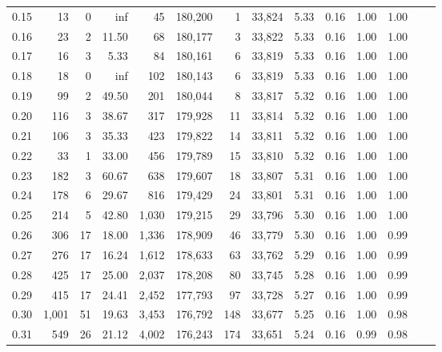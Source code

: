\begin{tabular}{rrrrrrrrrrrrrr}
0.15 &     13 &      0 &     inf &       45 &  180,200 &       1 &  33,824 &  5.33 &  0.16 &  1.00 &      1.00 \\
0.16 &     23 &      2 &   11.50 &       68 &  180,177 &       3 &  33,822 &  5.33 &  0.16 &  1.00 &      1.00 \\
0.17 &     16 &      3 &    5.33 &       84 &  180,161 &       6 &  33,819 &  5.33 &  0.16 &  1.00 &      1.00 \\
0.18 &     18 &      0 &     inf &      102 &  180,143 &       6 &  33,819 &  5.33 &  0.16 &  1.00 &      1.00 \\
0.19 &     99 &      2 &   49.50 &      201 &  180,044 &       8 &  33,817 &  5.32 &  0.16 &  1.00 &      1.00 \\
0.20 &    116 &      3 &   38.67 &      317 &  179,928 &      11 &  33,814 &  5.32 &  0.16 &  1.00 &      1.00 \\
0.21 &    106 &      3 &   35.33 &      423 &  179,822 &      14 &  33,811 &  5.32 &  0.16 &  1.00 &      1.00 \\
0.22 &     33 &      1 &   33.00 &      456 &  179,789 &      15 &  33,810 &  5.32 &  0.16 &  1.00 &      1.00 \\
0.23 &    182 &      3 &   60.67 &      638 &  179,607 &      18 &  33,807 &  5.31 &  0.16 &  1.00 &      1.00 \\
0.24 &    178 &      6 &   29.67 &      816 &  179,429 &      24 &  33,801 &  5.31 &  0.16 &  1.00 &      1.00 \\
0.25 &    214 &      5 &   42.80 &    1,030 &  179,215 &      29 &  33,796 &  5.30 &  0.16 &  1.00 &      1.00 \\
0.26 &    306 &     17 &   18.00 &    1,336 &  178,909 &      46 &  33,779 &  5.30 &  0.16 &  1.00 &      0.99 \\
0.27 &    276 &     17 &   16.24 &    1,612 &  178,633 &      63 &  33,762 &  5.29 &  0.16 &  1.00 &      0.99 \\
0.28 &    425 &     17 &   25.00 &    2,037 &  178,208 &      80 &  33,745 &  5.28 &  0.16 &  1.00 &      0.99 \\
0.29 &    415 &     17 &   24.41 &    2,452 &  177,793 &      97 &  33,728 &  5.27 &  0.16 &  1.00 &      0.99 \\
0.30 &  1,001 &     51 &   19.63 &    3,453 &  176,792 &     148 &  33,677 &  5.25 &  0.16 &  1.00 &      0.98 \\
0.31 &    549 &     26 &   21.12 &    4,002 &  176,243 &     174 &  33,651 &  5.24 &  0.16 &  0.99 &      0.98 \\

\end{tabular}
